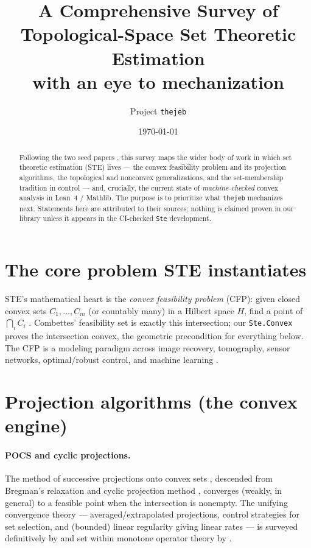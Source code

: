 \documentclass[11pt]{article}
\title{A Comprehensive Survey of Topological-Space Set Theoretic
Estimation\\\large with an eye to mechanization}
\author{Project \texttt{thejeb}}
\date{\today}
\begin{document}
\maketitle

\begin{abstract}
Following the two seed papers \citep{combettes1993,carlson2012}, this
survey maps the wider body of work in which set theoretic estimation
(STE) lives --- the convex feasibility problem and its projection
algorithms, the topological and nonconvex generalizations, and the
set-membership tradition in control --- and, crucially, the current state
of \emph{machine-checked} convex analysis in Lean~4 / Mathlib. The
purpose is to prioritize what \texttt{thejeb} mechanizes next. Statements
here are attributed to their sources; nothing is claimed proven in our
library unless it appears in the CI-checked \texttt{Ste} development.
\end{abstract}

\section{The core problem STE instantiates}
STE's mathematical heart is the \emph{convex feasibility problem} (CFP):
given closed convex sets $C_1,\dots,C_m$ (or countably many) in a Hilbert
space $H$, find a point of $\bigcap_i C_i$ \citep{combettes1993,
bauschke1996}. Combettes' feasibility set is exactly this intersection;
our \texttt{Ste.Convex} proves the intersection convex, the geometric
precondition for everything below. The CFP is a modeling paradigm across
image recovery, tomography, sensor networks, optimal/robust control, and
machine learning \citep{bauschke1996,combettes1993numerical}.

\section{Projection algorithms (the convex engine)}
\paragraph{POCS and cyclic projections.} The method of successive
projections onto convex sets \citep{youla1982}, descended from Bregman's
relaxation and cyclic projection method \citep{bregman1967}, converges
(weakly, in general) to a feasible point when the intersection is
nonempty. The unifying convergence theory --- averaged/extrapolated
projections, control strategies for set selection, and (bounded) linear
regularity giving linear rates --- is surveyed definitively by
\citet{bauschke1996} and set within monotone operator theory by
\citet{bauschke2017}.
\end{document}
